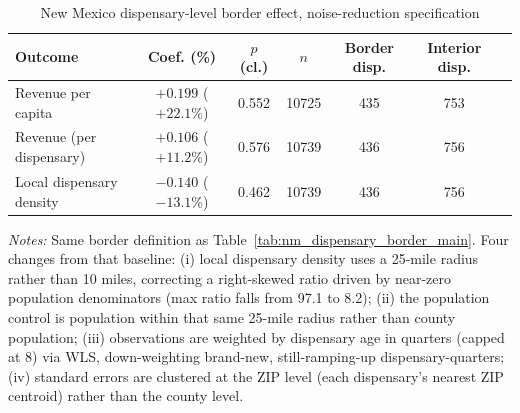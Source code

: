 \begin{table}[htbp]
\centering
\caption{New Mexico dispensary-level border effect, noise-reduction specification}
\label{tab:nm_dispensary_border_main_v2}
\footnotesize
\begin{tabular}{lcccccc}
\toprule
Outcome & Coef. (\%) & $p$ (cl.) & $n$ & Border disp. & Interior disp. \\
\midrule
Revenue per capita & $+0.199$ ($+22.1\%$) & 0.552 & 10725 & 435 & 753 \\
Revenue (per dispensary) & $+0.106$ ($+11.2\%$) & 0.576 & 10739 & 436 & 756 \\
Local dispensary density & $-0.140$ ($-13.1\%$) & 0.462 & 10739 & 436 & 756 \\
\bottomrule
\end{tabular}
\begin{minipage}{0.98\textwidth}
\vspace{0.3em}
\footnotesize
\textit{Notes:} Same border definition as Table~\ref{tab:nm_dispensary_border_main}. Four changes from that
baseline: (i) local dispensary density uses a 25-mile radius rather than 10 miles, correcting a right-skewed
ratio driven by near-zero population denominators (max ratio falls from 97.1 to 8.2); (ii) the population
control is population within that same 25-mile radius rather than county population; (iii) observations are
weighted by dispensary age in quarters (capped at 8) via WLS, down-weighting brand-new, still-ramping-up
dispensary-quarters; (iv) standard errors are clustered at the ZIP level (each dispensary's nearest ZIP
centroid) rather than the county level.
\end{minipage}
\end{table}
